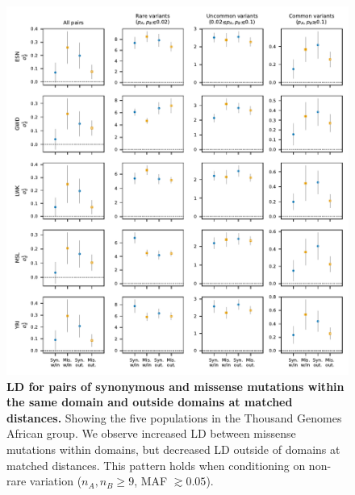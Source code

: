 \documentclass[]{article}
\begin{document}
\begin{figure}[ht!]
    \centering
    \includegraphics{../figures/data_domains_afr}
    \caption{
        \textbf{LD for pairs of synonymous and missense mutations within the
        same domain and outside domains at matched distances.}
        Showing the five populations in the Thousand Genomes African group.
        We observe increased LD between missense mutations within domains,
        but decreased LD outside of domains at matched distances. This pattern
        holds when conditioning on non-rare variation (\(n_A, n_B \geq 9\),
        MAF \(\gtrsim 0.05\)).
    }
    \label{fig:domainsAFR}
\end{figure}
\end{document}
